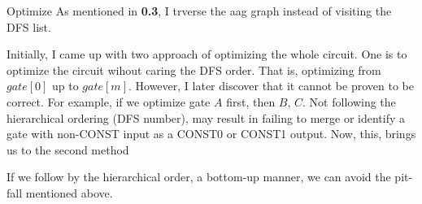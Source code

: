 \documentclass[12pt,a4paper]{report}
\begin{document}
\begin{section}{Optimize}
  As mentioned in \textbf{0.3}, I trverse the aag graph instead of visiting the DFS list.

  Initially, I came up with two approach of optimizing the whole circuit. One is to optimize the 
  circuit wihout caring the DFS order. That is, optimizing from $gate[0]$ up to $gate[m]$. However,
  I later discover that it cannot be proven to be correct. For example, if we optimize gate $A$ first,
  then $B$, $C$. Not following the hierarchical ordering (DFS number), may result in failing to merge
  or identify a gate with non-CONST input as a CONST0 or CONST1 output. Now, this, brings us to the second
  method

  If we follow by the hierarchical order, a bottom-up manner, we can avoid the pit-fall 
  mentioned above. 


\end{section}
\end{document}
